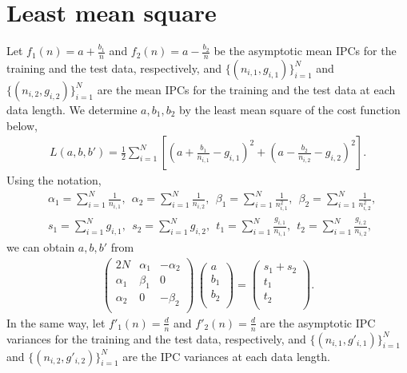 \documentclass{article}
\begin{document}
\section{Least mean square}
Let $f_1(n) = a + \frac{b_1}{n}$ and $f_2(n) = a - \frac{b_2}{n}$ be the asymptotic mean IPCs for the training and the test data, respectively, 
and $\{(n_{i,1}, g_{i,1})\}_{i=1}^N$ and $\{(n_{i,2}, g_{i,2})\}_{i=1}^N$ are the mean IPCs for the training and the test data at each data length. 
We determine $a, b_1, b_2$ by the least mean square of the cost function below, 
\begin{align}
 L(a, b, b') = \frac{1}{2} \sum_{i=1}^N \left[ \left(a + \frac{b_1}{n_{i, 1}} - g_{i,1}\right)^2 + \left(a - \frac{b_2}{n_{i, 2}} - g_{i,2}\right)^2\right]. 
\end{align}
Using the notation, 
\begin{align}
 & \alpha_1 = \sum_{i=1}^N \frac{1}{n_{i,1}}, \ \ 
 \alpha_2 = \sum_{i=1}^N \frac{1}{n_{i,2}}, \ \ 
 \beta_1 = \sum_{i=1}^N \frac{1}{n_{i,1}^2}, \ \ 
 \beta_2 = \sum_{i=1}^N \frac{1}{n_{i,2}^2}, \\
 & s_1 = \sum_{i=1}^N g_{i,1}, \ \ 
 s_2 = \sum_{i=1}^N g_{i,2}, \ \ 
 t_1 = \sum_{i=1}^N \frac{g_{i,1}}{n_{i,1}}, \ \ 
 t_2 = \sum_{i=1}^N \frac{g_{i,2}}{n_{i,2}}, 
\end{align}
we can obtain $a, b, b'$ from 
\begin{align}
 \begin{pmatrix}
  2 N & \alpha_1 & - \alpha_2 \\
  \alpha_1 & \beta_1 & 0 \\
  \alpha_2 & 0 & - \beta_2 \\
 \end{pmatrix} \, 
 \begin{pmatrix}
  a \\
  b_1 \\
  b_2 \\
 \end{pmatrix} = 
 \begin{pmatrix}
  s_1 + s_2 \\
  t_1 \\
  t_2 \\
 \end{pmatrix} .
\end{align}
In the same way, let $f'_1(n) = \frac{d}{n}$ and $f'_2(n) = \frac{d}{n}$ are the asymptotic IPC variances for the training and the test data, respectively, and $\{(n_{i,1}, g'_{i,1})\}_{i=1}^N$ and $\{(n_{i,2}, g'_{i,2})\}_{i=1}^N$ are the IPC variances at each data length. 
\end{document}
